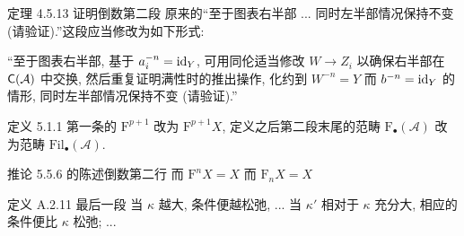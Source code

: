 \documentclass{AJerrata}
\begin{document}
\begin{Errata}
		\item[定理 4.5.13 证明倒数第二段]
		原来的``至于图表右半部 ... 同时左半部情况保持不变 (请验证).''这段应当修改为如下形式:
		
		``至于图表右半部, 基于 $a_i^{-n} = \mathrm{id}_Y$, 可用同伦适当修改 $W \to Z_i$ 以确保右半部在 $\mathsf{C}(\mathcal{A})$ 中交换, 然后重复证明满性时的推出操作, 化约到 $W^{-n} = Y$ 而 $b^{-n} = \mathrm{id}_Y$ 的情形, 同时左半部情况保持不变 (请验证).''
		
		\item[定义 5.1.1]
		第一条的 $\mathrm{F}^{p+1}$ 改为 $\mathrm{F}^{p+1} X$, 定义之后第二段末尾的范畴 $\mathrm{F}_{\bullet}(\mathcal{A})$ 改为范畴 $\mathrm{Fil}_{\bullet}(\mathcal{A})$.
		
		\item[推论 5.5.6 的陈述倒数第二行]
		\Orig 而 $\mathrm{F}^n X = X$
		\Corr 而 $\mathrm{F}_n X = X$
		
		\item[定义 A.2.11 最后一段]
		\Orig 当 $\kappa$ 越大, 条件便越松弛, ...
		\Corr 当 $\kappa'$ 相对于 $\kappa$ 充分大, 相应的条件便比 $\kappa$ 松弛; ...
	\end{Errata}
\end{document}
